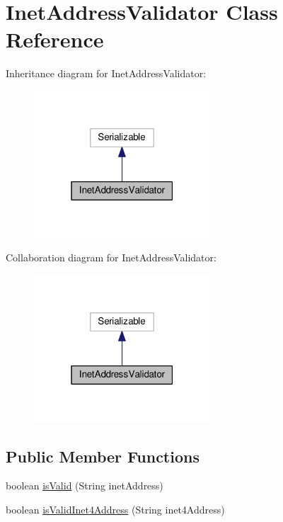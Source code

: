 \hypertarget{classInetAddressValidator}{}\section{Inet\+Address\+Validator Class Reference}
\label{classInetAddressValidator}


Inheritance diagram for Inet\+Address\+Validator\+:
\nopagebreak
\begin{figure}[H]
\begin{center}
\leavevmode
\includegraphics[width=187pt]{classInetAddressValidator__inherit__graph}
\end{center}
\end{figure}


Collaboration diagram for Inet\+Address\+Validator\+:
\nopagebreak
\begin{figure}[H]
\begin{center}
\leavevmode
\includegraphics[width=187pt]{classInetAddressValidator__coll__graph}
\end{center}
\end{figure}
\subsection*{Public Member Functions}
\begin{DoxyCompactItemize}
\item 
boolean \hyperlink{classInetAddressValidator_a266ab1d773ca178093917c9c2faae01a}{is\+Valid} (String inet\+Address)
\item 
boolean \hyperlink{classInetAddressValidator_a2bbbd69ca6baf133c01da93a5ad1b600}{is\+Valid\+Inet4\+Address} (String inet4\+Address)
\end{DoxyCompactItemize}
